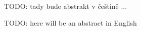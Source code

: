 \begin{abstract-czech}
TODO: tady bude abstrakt v češtině ...
\end{abstract-czech}
    
\begin{abstract-english}
TODO: here will be an abstract in English
\end{abstract-english}